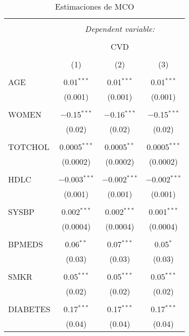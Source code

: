 
\begin{table}[!htbp] \centering 
  \caption{Estimaciones de MCO} 
  \label{tab:tabla_regresiones} 
\footnotesize 
\begin{tabular}{@{\extracolsep{1pt}}lccc} 
\\[-1.8ex]\hline 
\hline \\[-1.8ex] 
 & \multicolumn{3}{c}{\textit{Dependent variable:}} \\ 
\cline{2-4} 
\\[-1.8ex] & \multicolumn{3}{c}{CVD} \\ 
\\[-1.8ex] & (1) & (2) & (3)\\ 
\hline \\[-1.8ex] 
 AGE & 0.01$^{***}$ & 0.01$^{***}$ & 0.01$^{***}$ \\ 
  & (0.001) & (0.001) & (0.001) \\ 
  & & & \\ 
 WOMEN & $-$0.15$^{***}$ & $-$0.16$^{***}$ & $-$0.15$^{***}$ \\ 
  & (0.02) & (0.02) & (0.02) \\ 
  & & & \\ 
 TOTCHOL & 0.0005$^{***}$ & 0.0005$^{**}$ & 0.0005$^{***}$ \\ 
  & (0.0002) & (0.0002) & (0.0002) \\ 
  & & & \\ 
 HDLC & $-$0.003$^{***}$ & $-$0.002$^{***}$ & $-$0.002$^{***}$ \\ 
  & (0.001) & (0.001) & (0.001) \\ 
  & & & \\ 
 SYSBP & 0.002$^{***}$ & 0.002$^{***}$ & 0.001$^{***}$ \\ 
  & (0.0004) & (0.0004) & (0.0004) \\ 
  & & & \\ 
 BPMEDS & 0.06$^{**}$ & 0.07$^{***}$ & 0.05$^{*}$ \\ 
  & (0.03) & (0.03) & (0.03) \\ 
  & & & \\ 
 SMKR & 0.05$^{***}$ & 0.05$^{***}$ & 0.05$^{***}$ \\ 
  & (0.02) & (0.02) & (0.02) \\ 
  & & & \\ 
 DIABETES & 0.17$^{***}$ & 0.17$^{***}$ & 0.17$^{***}$ \\ 
  & (0.04) & (0.04) & (0.04) \\ 

\end{tabular}
\end{table}
